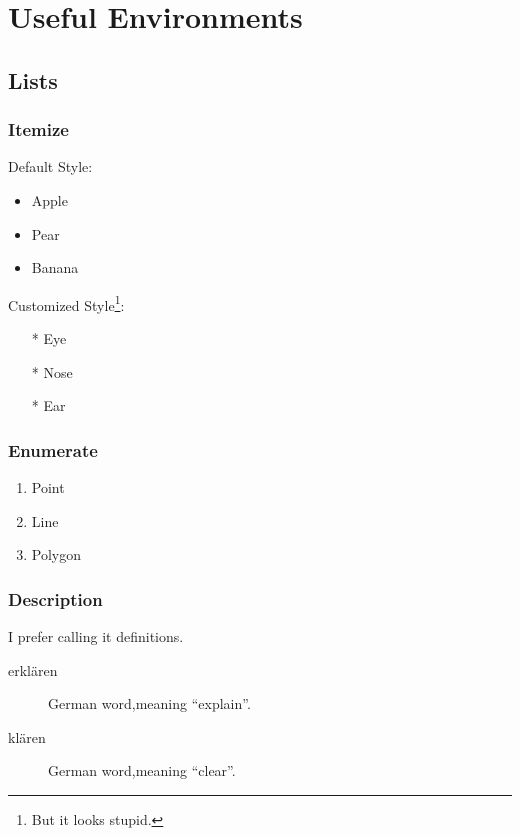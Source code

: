 \chapter{Useful Environments}

\section{Lists}

\subsection{Itemize}

Default Style:

\begin{itemize}

\item Apple
\item Pear
\item Banana
\end{itemize}

Customized Style\footnote{But it looks stupid.}:

\begin{itemize}

\item[*] Eye
\item[*] Nose
\item[*] Ear
\end{itemize}

\subsection{Enumerate}

\begin{enumerate}

\item Point
\item Line
\item Polygon
\end{enumerate}

\subsection{Description}

I prefer calling it definitions.

\begin{description}

\item[erkl\" aren]German word,meaning ``explain''.

\item[kl\" aren]German word,meaning ``clear''.

\end{description}

